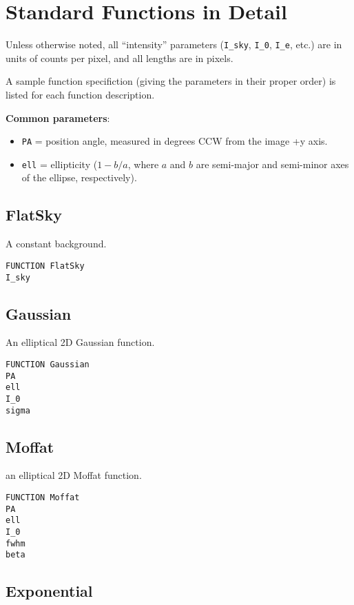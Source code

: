 \documentclass[10pt]{article}
\begin{document}
\appendix
\section{Standard Functions in Detail}\label{app:functions}

Unless otherwise noted, all ``intensity'' parameters (\texttt{I\_sky}, \texttt{I\_0}, \texttt{I\_e}, etc.)
are in units of counts per pixel, and all lengths are in pixels.

A sample function specifiction (giving the parameters in their proper order) is
listed for each function description.

\textbf{Common parameters}: 
\begin{itemize}
\item \texttt{PA} = position angle, measured in degrees CCW from
the image +y axis.
\item \texttt{ell} = ellipticity ($1 - b/a$, where $a$ and $b$ are semi-major and semi-minor
axes of the ellipse, respectively).
\end{itemize}


\subsection{FlatSky}

A constant background.

\begin{verbatim}
FUNCTION FlatSky
I_sky
\end{verbatim}


\subsection{Gaussian}

An elliptical 2D Gaussian function.

\begin{verbatim}
FUNCTION Gaussian
PA
ell
I_0
sigma
\end{verbatim}


\subsection{Moffat}

an elliptical 2D Moffat function.

\begin{verbatim}
FUNCTION Moffat
PA
ell
I_0
fwhm
beta
\end{verbatim}


\subsection{Exponential}
\end{document}
